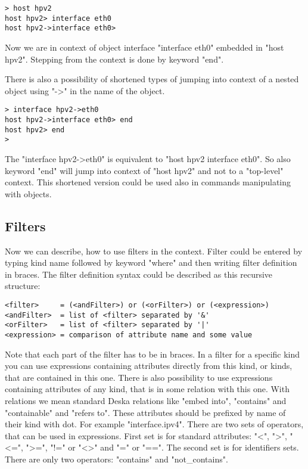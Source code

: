 \documentclass[deska]{subfiles}
\begin{document}
\begin{verbatim}
> host hpv2
host hpv2> interface eth0
host hpv2->interface eth0>
\end{verbatim}

Now we are in context of object interface "interface eth0" embedded in "host hpv2". Stepping from the context is done by
keyword "end".

There is also a possibility of shortened types of jumping into context of a nested object using "->" in the name of the
object.

\begin{verbatim}
> interface hpv2->eth0
host hpv2->interface eth0> end
host hpv2> end
>
\end{verbatim}

The "interface hpv2->eth0" is equivalent to "host hpv2 interface eth0". So also keyword "end" will jump into context of
"host hpv2" and not to a "top-level" context. This shortened version could be used also in commands manipulating with
objects.

\subsection{Filters}

Now we can describe, how to use filters in the context. Filter could be entered by typing kind name followed by keyword
"where" and then writing filter definition in braces. The filter definition syntax could be described as this recursive
structure:

\begin{verbatim}
<filter>     = (<andFilter>) or (<orFilter>) or (<expression>)
<andFilter>  = list of <filter> separated by '&'
<orFilter>   = list of <filter> separated by '|'
<expression> = comparison of attribute name and some value
\end{verbatim}

Note that each part of the filter has to be in braces. In a filter for a specific kind you can use expressions containing
attributes directly from this kind, or kinds, that are contained in this one. There is also possibility to use expressions
containing attributes of any kind, that is in some relation with this one. With relations we mean standard Deska relations
like "embed into", "contains" and "containable" and "refers to". These attributes should be prefixed by name of their
kind with dot. For example "interface.ipv4". There are two sets of operators, that can be used in expressions. First
set is for standard attributes: "<", ">", "<=", ">=", "!=" or "<>" and "=" or "==". The second set is for identifiers
sets. There are only two operators: "contains" and "not\_contains".
\end{document}
